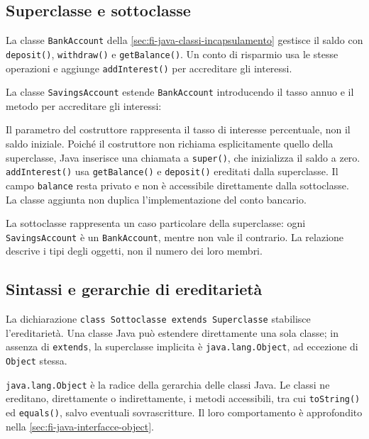\subsection{Superclasse e sottoclasse}
\label{sec:fi-java-ereditarieta-conti}

La classe \texttt{BankAccount} della
\cref{sec:fi-java-classi-incapsulamento} gestisce il saldo con
\texttt{deposit()}, \texttt{withdraw()} e \texttt{getBalance()}.
Un conto di risparmio usa le stesse operazioni e aggiunge
\texttt{addInterest()} per accreditare gli interessi.

\begin{example}
La classe \texttt{SavingsAccount} estende \texttt{BankAccount}
introducendo il tasso annuo e il metodo per accreditare gli
interessi:



Il parametro del costruttore rappresenta il tasso di interesse
percentuale, non il saldo iniziale. Poiché il costruttore non
richiama esplicitamente quello della superclasse, Java inserisce
una chiamata a \texttt{super()}, che inizializza il saldo a zero.
\texttt{addInterest()} usa \texttt{getBalance()} e \texttt{deposit()}
ereditati dalla superclasse. Il campo \texttt{balance} resta privato
e non è accessibile direttamente dalla sottoclasse. La classe aggiunta
non duplica l'implementazione del conto bancario.
\end{example}

La sottoclasse rappresenta un caso particolare della superclasse:
ogni \texttt{SavingsAccount} è un \texttt{BankAccount}, mentre
non vale il contrario. La relazione descrive i tipi degli oggetti,
non il numero dei loro membri.

\subsection{Sintassi e gerarchie di ereditarietà}
\label{sec:fi-java-ereditarieta-sintassi}

La dichiarazione
\lstinline|class Sottoclasse extends Superclasse| stabilisce
l'ereditarietà. Una classe Java può estendere direttamente una
sola classe; in assenza di \texttt{extends}, la superclasse
implicita è \texttt{java.lang.Object}, ad eccezione di
\texttt{Object} stessa.

\begin{definition}
\label{def:fi-java-ereditarieta-object}
\texttt{java.lang.Object} è la radice della gerarchia delle classi
Java. Le classi ne ereditano, direttamente o indirettamente,
i metodi accessibili, tra cui \texttt{toString()} ed
\texttt{equals()}, salvo eventuali sovrascritture. Il loro comportamento è
approfondito nella \cref{sec:fi-java-interfacce-object}.
\end{definition}


